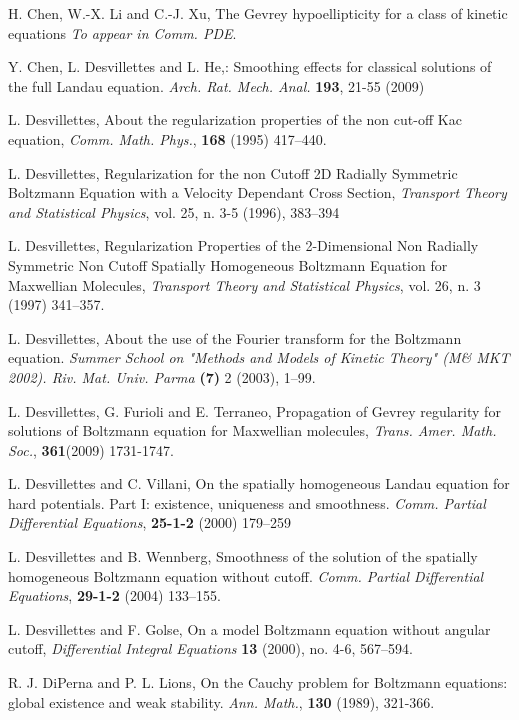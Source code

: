 \documentclass{amsart}[12pt, article]
\begin{document}
\begin{thebibliography}{99}
 H. Chen, W.-X. Li and C.-J. Xu, The Gevrey hypoellipticity for a class
of kinetic equations {\it To appear in Comm. PDE}.

 Y. Chen, L. Desvillettes and  L. He,: Smoothing effects
for classical solutions of the full Landau equation. {\it Arch. Rat. Mech. Anal.} {\bf 193}, 21-55 (2009)

 {L. Desvillettes,} About the regularization properties
of the non cut-off Kac equation, {\it Comm. Math. Phys.}, {\bf 168} (1995) 417--440.

 L. Desvillettes, Regularization for the non Cutoff 2D Radially Symmetric Boltzmann Equation with a Velocity Dependant Cross Section, {\it Transport Theory and Statistical Physics}, vol. 25, n. 3-5 (1996), 383--394

 L. Desvillettes, Regularization Properties of the 2-Dimensional Non Radially Symmetric Non Cutoff Spatially Homogeneous Boltzmann Equation for Maxwellian Molecules, {\it Transport Theory and Statistical Physics}, vol. 26, n. 3 (1997) 341--357.

 L. Desvillettes, About the use of the Fourier transform
for the Boltzmann equation. {\it Summer School on "Methods and
Models of Kinetic Theory" (M\& MKT 2002). Riv. Mat. Univ. Parma}
{\bf (7)} 2 (2003), 1--99.

L. Desvillettes, G. Furioli and E. Terraneo, Propagation of Gevrey
regularity for solutions of Boltzmann equation for Maxwellian
molecules, {\it Trans. Amer. Math. Soc.}, {\bf 361}(2009) 1731-1747.

 L. Desvillettes and C. Villani, On the spatially homogeneous Landau
equation for hard potentials. Part I: existence, uniqueness and
smoothness. {\it Comm. Partial Differential Equations}, {\bf 25-1-2}
(2000) 179--259

 L. Desvillettes and B. Wennberg, Smoothness of the solution
of the spatially homogeneous Boltzmann equation without cutoff.
{\it Comm. Partial Differential Equations}, {\bf 29-1-2} (2004) 133--155.

L. Desvillettes and F. Golse,  On a model Boltzmann equation without angular cutoff, {\it Differential Integral Equations}  {\bf 13 }  (2000),  no. 4-6, 567--594.

 R. J. DiPerna and P. L. Lions, On the Cauchy problem for Boltzmann
equations: global existence and weak stability. {\it Ann. Math.},
{\bf 130} (1989), 321-366.


\end{thebibliography}
\end{document}
